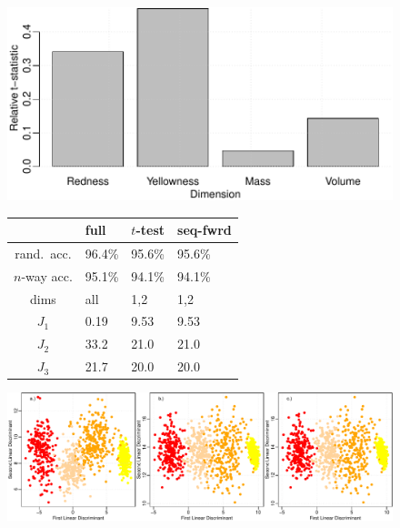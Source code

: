 \begin{figure}[H]
  \begin{minipage}[b]{0.45\linewidth}
    \includegraphics[width=\linewidth]{images/fruit_ttest.pdf}
  \end{minipage}
  \hfill
  \quad
  \begin{minipage}[b]{0.45\linewidth}
    \centering
    \begin{tabular}[b]{c|lll}
      & \textbf{full} & \textbf{$t$-test} & \textbf{seq-fwrd} \\
      \hline
      rand.~acc.   & 96.4\% & 95.6\%  & 95.6\% \\ 
      $n$-way acc. & 95.1\% & 94.1\%  & 94.1\% \\
      dims         & all    & 1,2     & 1,2 \\
      $J_1$        & 0.19   & 9.53    & 9.53 \\
      $J_2$        & 33.2   & 21.0    & 21.0 \\
      $J_3$        & 21.7   & 20.0    & 20.0 \\
    \end{tabular}
    \vspace{5mm}
  \end{minipage}
  \hfill
  \vspace{5mm}
  \quad
  \begin{minipage}[t]{1.00\linewidth}
    \includegraphics[width=\linewidth]{images/fruit.pdf}
  \end{minipage}

\end{figure}
